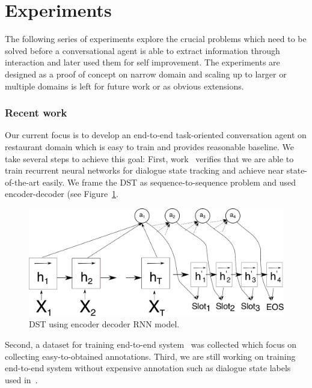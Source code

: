 \documentclass[11pt]{article}
\begin{document}
\section{Experiments}
\label{sec:experiments}
The following series of experiments explore the crucial problems which need to be solved before a conversational agent is able to extract information through interaction and later used them for self improvement.
The experiments are designed as a proof of concept on narrow domain and scaling up to larger or multiple domains is left for future work or as obvious extensions. 

\subsubsection*{Recent work}
Our current focus is to develop an end-to-end task-oriented conversation agent on restaurant domain which is easy to train and provides reasonable baseline.
We take several steps to achieve this goal:
First, work~\cite{platek_recurrent_2016} verifies that we are able to train recurrent neural networks for dialogue state tracking and achieve near state-of-the-art easily. 
We frame the DST as sequence-to-sequence problem and used encoder-decoder (see Figure~\ref{fig:dst_seq2seq}. 

\begin{figure}[htpb]
    \centering
    \includegraphics[width=1.0\linewidth]{dst_seq2seq}
    \caption{DST using encoder decoder RNN model.}
    \label{fig:dst_seq2seq}
\end{figure}

Second, a dataset for training end-to-end system~\cite{platek2016wochat} was collected which focus on collecting easy-to-obtained annotations.
Third, we are still working on training end-to-end system without expensive annotation such as dialogue state labels used in~\cite{wen_networkbased_2016}.
\end{document}
